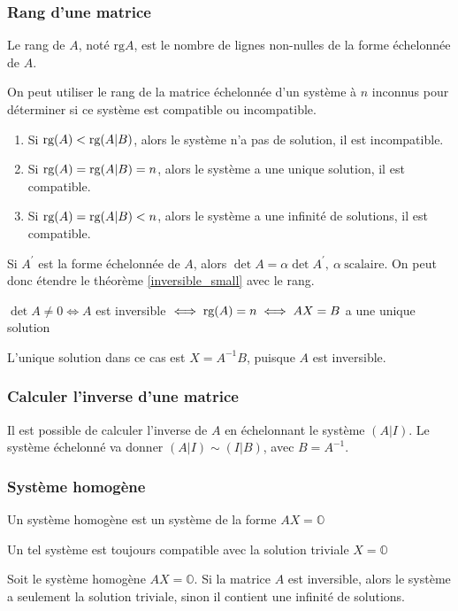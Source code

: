 \subsubsection{Rang d'une matrice}
\begin{definition}
    Le rang de $A$, noté $\text{rg}A$, est le nombre de lignes non-nulles de la forme échelonnée de $A$.
\end{definition}
\begin{lemma}
    On peut utiliser le rang de la matrice échelonnée d'un système à $n$ inconnus pour déterminer si ce système est compatible ou incompatible.
    \begin{enumerate}
        \item Si $\textup{rg}(A) < \textup{rg}(A|B)$, alors le système n'a pas de solution, il est incompatible.
        \item Si $\textup{rg}(A) = \textup{rg}(A|B) = n$, alors le système a une unique solution, il est compatible.
        \item Si $\textup{rg}(A) = \textup{rg}(A|B) < n$, alors le système a une infinité de solutions, il est compatible.
    \end{enumerate}
\end{lemma}
\begin{remark}
    Si $A^\prime$ est la forme échelonnée de $A$, alors $\det A = \alpha \det A^\prime, \ \alpha
        \ \text{scalaire}$.
    On peut donc étendre le théorème \ref{inversible_small} avec le rang.
\end{remark}
\begin{theorem}
    \label{theorem_extended_once}
    $\det A \neq 0 \iff A $ est inversible $\iff \textup{rg}(A) = n \iff AX=B $ a une unique solution
\end{theorem}
\begin{remark}
    L'unique solution dans ce cas est $X = A^{-1}B$, puisque $A$ est inversible.
\end{remark}

\subsubsection{Calculer l'inverse d'une matrice}
Il est possible de calculer l'inverse de $A$ en échelonnant le système $(A|I)$. Le
système échelonné va donner $(A|I) \sim (I|B)$, avec $B = A^{-1}$.

\subsubsection{Système homogène}
\begin{definition}
    Un système homogène est un système de la forme $AX = \mathbb{O}$
\end{definition}
\begin{remark}
    Un tel système est toujours compatible avec la solution triviale $X = \mathbb{O}$
\end{remark}
\begin{theorem}
    Soit le système homogène $AX = \mathbb{O}$. Si la matrice $A$ est inversible, alors le système a seulement la solution triviale, sinon il contient une infinité de solutions.
\end{theorem}

